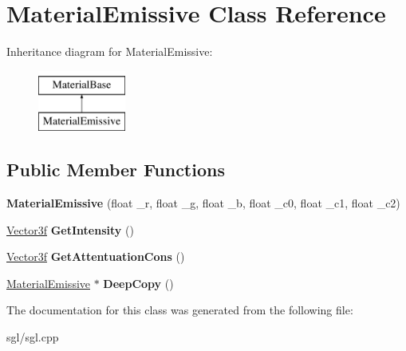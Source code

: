 \hypertarget{class_material_emissive}{}\section{Material\+Emissive Class Reference}
\label{class_material_emissive}
Inheritance diagram for Material\+Emissive\+:\begin{figure}[H]
\begin{center}
\leavevmode
\includegraphics[height=2.000000cm]{class_material_emissive}
\end{center}
\end{figure}
\subsection*{Public Member Functions}
\begin{DoxyCompactItemize}
\item 
\mbox{\label{class_material_emissive_aa269b64e4ea77d39af1bdeb65776246d}} 
{\bfseries Material\+Emissive} (float \+\_\+r, float \+\_\+g, float \+\_\+b, float \+\_\+c0, float \+\_\+c1, float \+\_\+c2)
\item 
\mbox{\label{class_material_emissive_ac9290f5c0c1eb3c6e0931520018b08d5}} 
\hyperlink{class_vector3f}{Vector3f} {\bfseries Get\+Intensity} ()
\item 
\mbox{\label{class_material_emissive_aeb4a407be901bc2d2f465d5cc1df9baf}} 
\hyperlink{class_vector3f}{Vector3f} {\bfseries Get\+Attentuation\+Cons} ()
\item 
\mbox{\label{class_material_emissive_ae53e01766e3942ceb4a62bdc91309fb3}} 
\hyperlink{class_material_emissive}{Material\+Emissive} $\ast$ {\bfseries Deep\+Copy} ()
\end{DoxyCompactItemize}


The documentation for this class was generated from the following file\+:\begin{DoxyCompactItemize}
\item 
sgl/sgl.\+cpp\end{DoxyCompactItemize}
